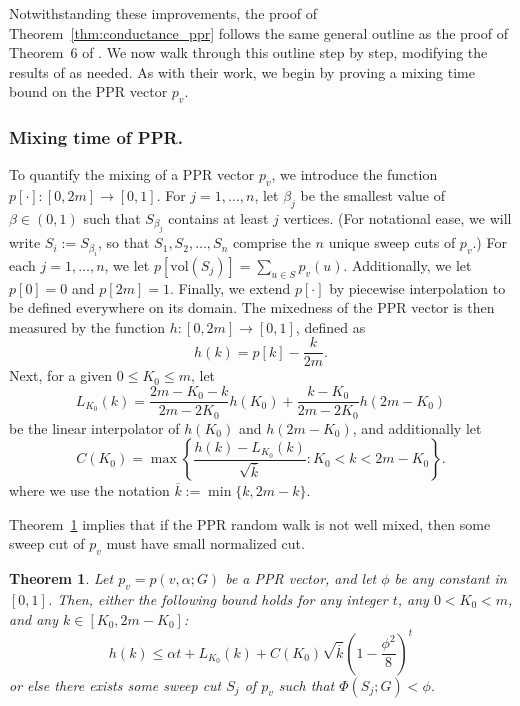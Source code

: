 \documentclass[11pt,twoside]{article}
\newtheorem{theorem}{Theorem}
\theoremstyle{definition}
\newcommand{\set}[1]{\left\{#1\right\}}
\newcommand{\vol}{\mathrm{vol}}
\newcommand{\1}{\mathbbm{1}}
\begin{document}
Notwithstanding these improvements, the proof of Theorem~\ref{thm:conductance_ppr} follows the same general outline as the proof of Theorem~6 of \citet{andersen2006}. We now walk through this outline step by step, modifying the results of \citet{andersen2006} as needed. As with their work, we begin by proving a mixing time bound on the PPR vector $p_v$.

\subsubsection{Mixing time of PPR.}

To quantify the mixing of a PPR vector $p_v$, we introduce the function $p[\cdot]: [0,2m] \to [0,1]$. For $j = 1,\ldots,n$, let $\beta_j$ be the smallest value of $\beta \in (0,1)$ such that $S_{\beta_j}$ contains at least $j$ vertices. (For notational ease, we will write $S_{i} := S_{\beta_i}$, so that $S_1,S_2,\ldots,S_n$ comprise the $n$ unique sweep cuts of $p_v$.)
For each $j = 1,\ldots,n$, we let $p[\vol(S_j)] =  \sum_{u \in S} p_v(u)$. Additionally, we let $p[0] = 0$ and $p[2m] = 1$. Finally, we extend $p[\cdot]$  by piecewise interpolation to be defined everywhere on its domain. The mixedness of the PPR vector is then measured by the function $h:[0,2m] \to [0,1]$, defined as 
\begin{equation*}
h(k) = p[k] - \frac{k}{2m}.
\end{equation*}
Next, for a given $0 \leq K_0 \leq m$, let 
\begin{equation*}
L_{K_0}(k) = \frac{2m - K_0 - k}{2m - 2K_0}h(K_0) + \frac{k - K_0}{2m - 2K_0}h(2m - K_0)
\end{equation*}
be the linear interpolator of $h(K_0)$ and $h(2m - K_0)$, and additionally let
\begin{equation*}
C(K_0) = \max\set{\frac{h(k) - L_{K_0}(k)}{\sqrt{\overline{k}}}: K_0 < k < 2m - K_0}.
\end{equation*}
where we use the notation $\overline{k} := \min\{k, 2m - k\}$.

Theorem~\ref{thm:mixing_time_PPR} implies that if the PPR random walk is not well mixed, then some sweep cut of $p_v$ must have small normalized cut.
\begin{theorem}
	\label{thm:mixing_time_PPR}
	Let $p_v = p(v,\alpha;G)$ be a PPR vector, and let $\phi$ be any constant in $[0,1]$. Then, either the following bound holds for any integer $t$, any $0 < K_0 < m$, and any $k \in [K_0,2m - K_0]$:
	\begin{equation}
	\label{eqn:mixing_time_PPR}
	h(k) \leq \alpha t + L_{K_0}(k) + C(K_0)\sqrt{\overline{k}}\left(1 - \frac{\phi^2}{8}\right)^t
	\end{equation}
	or else there exists some sweep cut $S_j$ of $p_v$ such that $\Phi(S_j;G) < \phi$.
\end{theorem}
\end{document}
